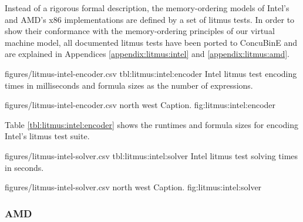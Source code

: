 Instead of a rigorous formal description, the memory-ordering models of Intel's \cite{ref:Intel} and AMD's \cite{ref:AMD} x86 implementations are defined by a set of litmus tests.
In order to show their conformance with the memory-ordering principles of our virtual machine model, all documented litmus tests have been ported to ConcuBinE and are explained in Appendices \ref{appendix:litmus:intel} and \ref{appendix:litmus:amd}.


\newcommand{\StatsTableRowHeader}[1]{\hyperref[tbl:litmus:intel:#1]{#1}}


\EncoderStatsTable
  {figures/litmus-intel-encoder.csv}
  {tbl:litmus:intel:encoder}
  {Intel litmus test encoding times in milliseconds and formula sizes as the number of expressions.}

\EncoderStatsGraph
  {figures/litmus-intel-encoder.csv}
  {north west}
  {Caption.}
  {fig:litmus:intel:encoder}

\newpage
\noindent
Table \ref{tbl:litmus:intel:encoder} shows the runtimes and formula sizes for encoding Intel's litmus test suite.


\newpage

\SolverStatsTable
  {figures/litmus-intel-solver.csv}
  {tbl:litmus:intel:solver}
  {Intel litmus test solving times in seconds.}

\SolverStatsGraph
  {figures/litmus-intel-solver.csv}
  {north west}
  {Caption.}
  {fig:litmus:intel:solver}

\newpage

\subsubsection*{AMD}

\renewcommand{\StatsTableRowHeader}[1]{\hyperref[tbl:litmus:amd:#1]{#1}}

